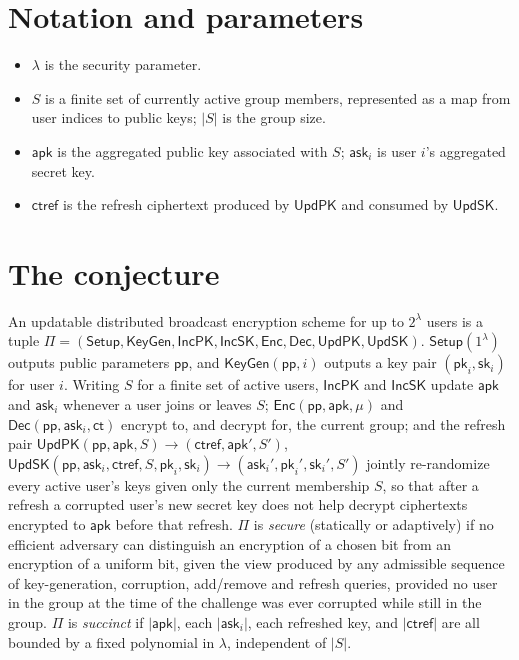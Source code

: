 \documentclass{aicr-conjecture}
\newcommand{\lam}{\lambda}
\newcommand{\UpdPK}{\mathsf{UpdPK}}
\newcommand{\UpdSK}{\mathsf{UpdSK}}
\newcommand{\apk}{\mathsf{apk}}
\newcommand{\ask}{\mathsf{ask}}
\newcommand{\pk}{\mathsf{pk}}
\newcommand{\sk}{\mathsf{sk}}
\newcommand{\ctref}{\mathsf{ctref}}
\begin{document}
\section{Notation and parameters}\label{sec:notation}

\begin{itemize}[nosep]
  \item $\lam$ is the security parameter.
  \item $S$ is a finite set of currently active group members,
    represented as a map from user indices to public keys; $|S|$ is
    the group size.
  \item $\apk$ is the aggregated public key associated with $S$;
    $\ask_{i}$ is user $i$'s aggregated secret key.
  \item $\ctref$ is the refresh ciphertext produced by $\UpdPK$ and
    consumed by $\UpdSK$.
\end{itemize}

\section{The conjecture}\label{sec:conjectures}

\begin{definition}\label{def:updbe}
An updatable distributed broadcast encryption scheme for up to
$2^{\lam}$ users is a tuple
$\Pi = (\mathsf{Setup}, \mathsf{KeyGen}, \mathsf{IncPK}, \mathsf{IncSK},
\mathsf{Enc}, \mathsf{Dec}, \UpdPK, \UpdSK)$. $\mathsf{Setup}(1^{\lam})$
outputs public parameters $\mathsf{pp}$, and $\mathsf{KeyGen}(\mathsf{pp}, i)$
outputs a key pair $(\pk_{i}, \sk_{i})$ for user $i$. Writing $S$ for a
finite set of active users, $\mathsf{IncPK}$ and $\mathsf{IncSK}$
update $\apk$ and $\ask_{i}$ whenever a user joins or leaves $S$;
$\mathsf{Enc}(\mathsf{pp}, \apk, \mu)$ and
$\mathsf{Dec}(\mathsf{pp}, \ask_{i}, \mathsf{ct})$ encrypt to, and
decrypt for, the current group; and the refresh pair
$\UpdPK(\mathsf{pp}, \apk, S) \to (\ctref, \apk', S')$,
$\UpdSK(\mathsf{pp}, \ask_{i}, \ctref, S, \pk_{i}, \sk_{i}) \to
(\ask_{i}', \pk_{i}', \sk_{i}', S')$ jointly re-randomize every active
user's keys given only the current membership $S$, so that after a
refresh a corrupted user's new secret key does not help decrypt
ciphertexts encrypted to $\apk$ before that refresh. $\Pi$ is
\emph{secure} (statically or adaptively) if no efficient adversary can
distinguish an encryption of a chosen bit from an encryption of a
uniform bit, given the view produced by any admissible sequence of
key-generation, corruption, add/remove and refresh queries, provided no
user in the group at the time of the challenge was ever corrupted while
still in the group. $\Pi$ is \emph{succinct} if $|\apk|$, each
$|\ask_{i}|$, each refreshed key, and $|\ctref|$ are all bounded by a
fixed polynomial in $\lam$, independent of $|S|$.
\end{definition}
\end{document}
